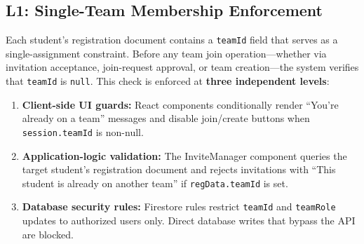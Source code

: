 \documentclass[12pt,a4paper]{article}
\begin{document}
\begin{figure}[H]
\centering
{}
\end{figure}

\subsection{L1: Single-Team Membership Enforcement}

Each student's registration document contains a \texttt{teamId} field that serves as a single-assignment constraint. Before any team join operation---whether via invitation acceptance, join-request approval, or team creation---the system verifies that \texttt{teamId} is \texttt{null}. This check is enforced at \textbf{three independent levels}:

\begin{enumerate}[noitemsep,topsep=3pt]
    \item \textbf{Client-side UI guards:} React components conditionally render ``You're already on a team'' messages and disable join/create buttons when \texttt{session.teamId} is non-null.
    \item \textbf{Application-logic validation:} The InviteManager component queries the target student's registration document and rejects invitations with ``This student is already on another team'' if \texttt{regData.teamId} is set.
    \item \textbf{Database security rules:} Firestore rules restrict \texttt{teamId} and \texttt{teamRole} updates to authorized users only. Direct database writes that bypass the API are blocked.
\end{enumerate}
\end{document}
